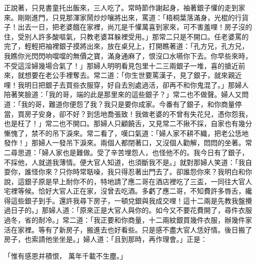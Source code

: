 \begin{showcontents}{}
正說著，只見書童托出飯來，三人吃了。常時節作謝起身，袖著銀子懽的走到家來。剛剛進門，只見那渾家鬧炒炒嚷將出來，罵道：「梧桐葉落滿身，光棍的行貨子！出去一日，把老婆餓在家裡，尚兀是千懽萬喜到家來，可不害羞哩！房子沒的住，受別人許多酸嘔氣，只教老婆耳躲裡受用。」那常二只是不開口。任老婆罵的完了，輕輕把袖裡銀子摸將出來，放在桌兒上，打開瞧著道：「孔方兄，孔方兄，我瞧你光閃閃响噹噹的無價之寶，滿身通麻了，恨沒口水嚥你下去。你早些來時，不受這淫婦幾場合氣了！」那婦人明明看見包里十二三兩銀子一堆，喜的搶近前來，就想要在老公手裡奪去。常二道：「你生世要罵漢子，見了銀子，就來親近哩！我明日把銀子去買些衣服穿，好自去別處過活，卻再不和你鬼混了。」那婦人陪著笑臉道：「我的哥，端的此是那里來的這些銀子？」常二也不做聲。婦人又問道：「我的哥，難道你便怨了我？我只是要你成家。今番有了銀子，和你商量停當，買房子安身，卻不好？到恁地喬張致！我做老婆的不曾有失花兒，憑你怨我，也是枉了！」常二也不開口。那婦人只顧饒舌，又見常二不揪不採，自家也有幾分慚愧了，禁不的吊下淚來。常二看了，嘆口氣道：「婦人家不耕不織，把老公恁地發作！」那婦人一發吊下淚來。兩個人都閉著口，又沒個人勸解，悶悶的坐著。常二尋思道：「婦人家也是難做。受了辛苦埋怨人，也怪他不的。我今日有了銀子，不採他，人就道我薄情。便大官人知道，也須斷我不是。」就對那婦人笑道：「我自耍你，誰怪你來？只你時常聒噪，我只得忍著出門去了。卻誰怨你來？我明白和你說，這銀子原是早上耐你不的，特地請了應二哥在酒店裡吃了三盃，一同往大官人宅裡等候。恰好大官人正在家，沒曾去吃酒。多虧了應二哥，不知費許多唇舌，纔得這些銀子到手。還許我尋下房子，一頓兌銀與我成交哩！這十二兩是先教我盤攪過日子的。」那婦人道：「原來正是大官人與你的。如今又不要花費開了，尋件衣服過冬，省的耐冷。」常二道：「我正要和你商量，十二兩紋銀買幾件衣服，辦幾件家活在家裡。等有了新房子，搬進去也好看些。只是感不盡大官人恁好情。後日搬了房子，也索請他坐坐是。」婦人道：「且到那時，再作理會。」正是：

「惟有感恩并積恨，  萬年千載不生塵。」


\end{showcontents}
